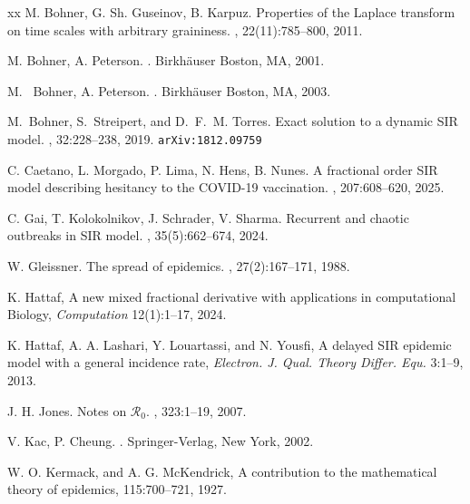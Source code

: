 \documentclass[pdflatex,sn-mathphys-num]{sn-jnl}
\theoremstyle{remark}
\begin{document}
\begin{thebibliography}{xx}
M. Bohner, G. Sh. Guseinov, B. Karpuz.
\newblock Properties of the Laplace transform on time scales with arbitrary graininess. 
, 22(11):785--800, 2011.

M. Bohner, A. Peterson.
.
\newblock Birkhäuser Boston, MA, 2001.

M. ~Bohner, A. Peterson.
.
\newblock Birkhäuser Boston, MA, 2003. 

M.~Bohner, S.~Streipert, and D.~F.~M. Torres.
\newblock Exact solution to a dynamic {SIR} model.
, 32:228--238, 2019.
{\tt arXiv:1812.09759}

C. Caetano, L. Morgado, P. Lima, N. Hens, B. Nunes. 
\newblock A fractional order SIR model describing hesitancy to the COVID-19 vaccination. 
, 207:608--620, 2025.

C. Gai, T. Kolokolnikov, J. Schrader, V. Sharma.
\newblock Recurrent and chaotic outbreaks in SIR model.
, 35(5):662--674, 2024.

W. Gleissner.
\newblock The spread of epidemics. 
, 27(2):167--171, 1988.

K. Hattaf,  
A new mixed fractional derivative with applications in computational Biology, 
{\em Computation} 12(1):1--17, 2024.

K. Hattaf, A. A. Lashari, Y. Louartassi, and N. Yousfi, 
A delayed SIR epidemic model with a general incidence rate,
{\em Electron. J. Qual. Theory Differ. Equ.} 3:1--9, 2013.

J. H. Jones. 
\newblock Notes on $\mathcal{R}_0$. 
, 323:1--19, 2007.

V. Kac, P. Cheung.
.
\newblock Springer-Verlag, New York, 2002.

W. O. Kermack, and A. G. McKendrick,
\newblock A contribution to the mathematical theory of epidemics,
 115:700--721, 1927.


\end{thebibliography}
\end{document}
